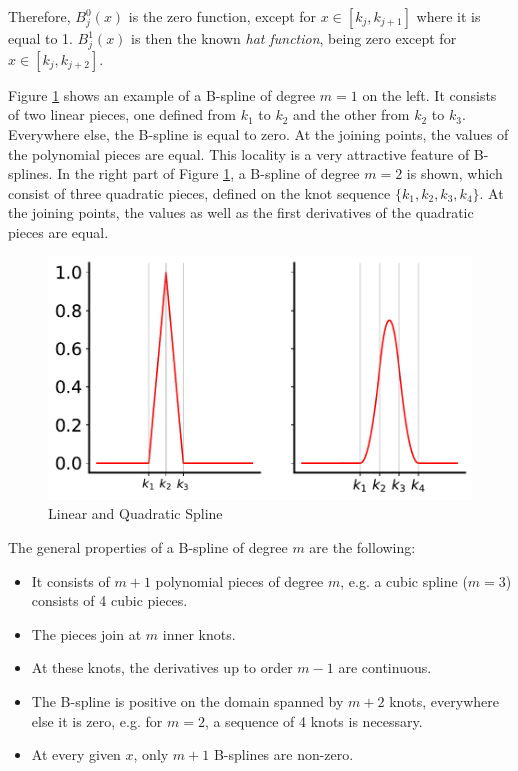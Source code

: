 \documentclass[10pt,a4paper]{article}
\begin{document}
Therefore, $B_j^0(x)$ is the zero function, except for $x \in [k_j, k_{j+1}]$ where it is equal to 1. $B_j^1(x)$ is then the known \emph{hat function}, being zero except for $x \in [k_j, k_{j+2}]$. 

Figure \ref{fig:lin_and_quad_spline} shows an example of a B-spline of degree $m=1$ on the left. It consists of two linear pieces, one defined from $k_1$ to $k_2$ and the other from $k_2$ to $k_3$. Everywhere else, the B-spline is equal to zero. At the joining points, the values of the polynomial pieces are equal. This locality is a very attractive feature of B-splines. In the right part of Figure \ref{fig:lin_and_quad_spline}, a B-spline of degree $m=2$ is shown, which consist of three quadratic pieces, defined on the knot sequence $\{k_1, k_2, k_3, k_4\}$. At the joining points, the values as well as the first derivatives of the quadratic pieces are equal. 

\begin{figure}[H] 
	\centering
	\includegraphics[width=\columnwidth]{../thesisplots/linear_and_quadratic_spline.pdf}
	\caption{Linear and Quadratic Spline}
	\label{fig:lin_and_quad_spline}
\end{figure}

The general properties of a B-spline of degree $m$ are the following:

\begin{itemize}
	\item It consists of $m+1$ polynomial pieces of degree $m$, e.g. a cubic spline ($m=3$) consists of 4 cubic pieces.
	\item The pieces join at $m$ inner knots.
	\item At these knots, the derivatives up to order $m-1$ are continuous.
	\item The B-spline is positive on the domain spanned by $m+2$ knots, everywhere else it is zero, e.g. for $m=2$, a sequence of 4 knots is necessary.
	\item At every given $x$, only $m+1$ B-splines are non-zero.
\end{itemize}
\end{document}
